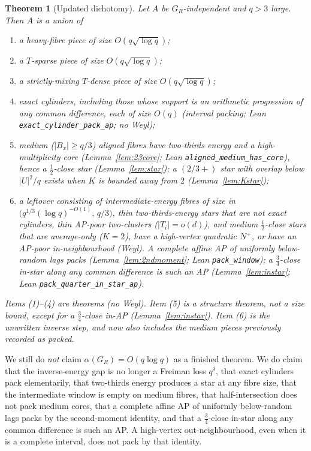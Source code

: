 \documentclass[11pt]{article}
\newtheorem{theorem}{Theorem}
\theoremstyle{definition}
\begin{document}
\begin{theorem}[Updated dichotomy]\label{thm:dichotomy2}
Let $A$ be $G_R$-independent and $q>3$ large.
Then $A$ is a union of
\begin{enumerate}
  \item a heavy-fibre piece of size $O(q\sqrt{\log q})$;
  \item a $T$-sparse piece of size $O(q\sqrt{\log q})$;
  \item a strictly-mixing $T$-dense piece of size $O(q\sqrt{\log q})$;
  \item exact cylinders, including those whose support is an arithmetic
        progression of any common difference, each of size $O(q)$
        (interval packing; Lean \texttt{exact\_cylinder\_pack\_ap}; no Weyl);
  \item medium ($|B_x|\ge q/3$) aligned fibres have two-thirds energy and
        a high-multiplicity core (Lemma~\ref{lem:23core}; Lean
        \texttt{aligned\_medium\_has\_core}), hence a $\tfrac12$-close
        star (Lemma~\ref{lem:star}); a $(2/3+)$ star with overlap below
        $|U|^{2}/q$ exists when $K$ is bounded away from $2$
        (Lemma~\ref{lem:Kstar});
  \item a leftover consisting of intermediate-energy fibres of size in
        $\bigl(q^{1/3}(\log q)^{-O(1)},\,q/3\bigr)$,
        thin two-thirds-energy stars that are not exact cylinders,
        thin AP-poor two-clusters ($|T_i|=o(d)$),
        and medium $\tfrac12$-close stars that are average-only
        ($K=2$), have a high-vertex quadratic $N^+$, or have an
        AP-poor in-neighbourhood (Weyl).
        A complete affine AP of uniformly below-random lags packs
        (Lemma~\ref{lem:2ndmoment}; Lean \texttt{pack\_window});
        a $\tfrac34$-close in-star along any common difference is
        such an AP (Lemma~\ref{lem:instar}; Lean
        \texttt{pack\_quarter\_in\_star\_ap}).
\end{enumerate}
Items (1)--(4) are theorems (no Weyl).
Item (5) is a structure theorem, not a size bound, except for a
$\tfrac34$-close in-AP (Lemma~\ref{lem:instar}).
Item (6) is the unwritten inverse step, and now also includes the medium
pieces previously recorded as packed.
\end{theorem}

We still do \emph{not} claim $\alpha(G_R)=O(q\log q)$ as a finished theorem.
We do claim that the inverse-energy gap is no longer a Freiman loss $q^{\delta}$,
that exact cylinders pack elementarily, that two-thirds energy produces a
star at any fibre size, that the intermediate window is empty on medium
fibres, that half-intersection does not pack medium cores, that a
complete affine AP of uniformly below-random lags packs by the
second-moment identity, and that a $\tfrac34$-close in-star along
any common difference is such an AP.
A high-vertex out-neighbourhood, even when it is a complete interval,
does not pack by that identity.
\end{document}
